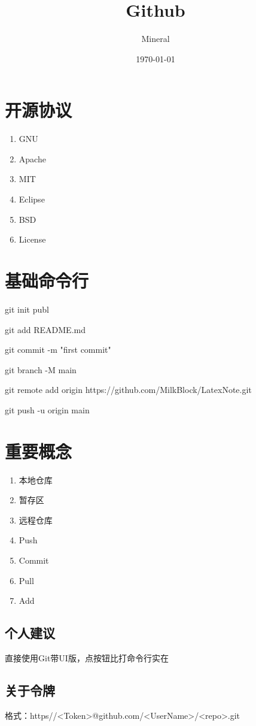 \documentclass[utf8]{ctexart}
\author{Mineral}
\title{Github}
\date {\today}
\begin{document}
		\maketitle
		\section{开源协议}
		\begin{enumerate}
				\item GNU
				\item Apache
				\item MIT
				\item Eclipse
				\item BSD
				\item License
		\end{enumerate}		
		\section{基础命令行}
	    \par git init publ
		\par git add README.md
		\par git commit -m "first commit"
		\par git branch -M main
		\par git remote add origin https://github.com/MilkBlock/LatexNote.git
		\par git push -u origin main
		\section{重要概念}
		\begin{enumerate}
				\item 本地仓库
				\item 暂存区
				\item 远程仓库
			\item Push
		\item Commit
			\item Pull
	\item Add
		\end{enumerate}
		\subsection{个人建议}
		\par 直接使用Git带UI版，点按钮比打命令行实在
		\subsection{关于令牌}
		\par 格式：https//<Token>@github.com/<UserName>/<repo>.git
\end{document}
